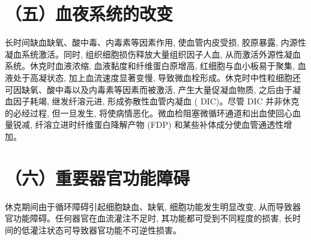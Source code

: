 \documentclass[10pt]{article}
\begin{document}
\section*{（五）血夜系统的改变}
长时间缺血缺氧、酸中毒、内毒素等因素作用, 使血管内皮受损, 胶原暴露, 内源性凝血系统激活。同时, 组织细胞损伤释放大量组织因子人血, 从而激活外源性凝血系统。休克时血液浓缩, 血液黏度和纤维蛋白原增高, 红细胞与血小板易于聚集, 血液处于高凝状态, 加上血流速度显著变慢, 导致微血栓形成。休克时中性粒细胞还可因缺氧、酸中毒以及内毒素等因素而被激活, 产生大量促凝血物质, 之后由于凝血因子耗竭, 继发纤溶元进, 形成弥散性血管内凝血 ( DIC)。尽管 DIC 并非休克的必经过程, 但一旦发生, 将使病情恶化。微血检阻塞微循环通道和出血使回心血量锐减, 纤溶立进时纤维蛋白降解产物 (FDP) 和某些补体成分使血管通透性增加。

\section*{（六）重要器官功能障碍}
休克期间由于循环障碍引起细胞缺血、缺氧, 细胞功能发生明显改变, 从而导致器官功能障碍。任何器官在血流灌注不足时, 其功能都可受到不同程度的损害, 长时间的低灌注状态可导致器官功能不可逆性损害。
\end{document}
